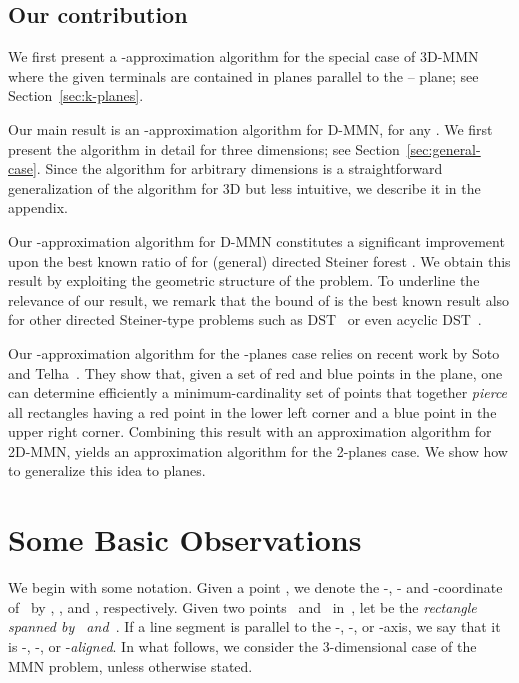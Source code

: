 \documentclass[11pt]{llncs}
\begin{document}
\subsection{Our contribution}  


We first present a -approximation algorithm for the special
case of 3D-MMN where the given terminals are contained in 
planes parallel to the -- plane; see Section~\ref{sec:k-planes}.

Our main result is an -approximation algorithm for
D-MMN, for any .  We first present the algorithm in detail
for three dimensions; see Section~\ref{sec:general-case}.  Since the
algorithm for arbitrary 
dimensions is a straightforward generalization of the algorithm for 3D
but less intuitive, we describe it in the appendix.

Our -approximation algorithm for D-MMN constitutes a
significant improvement 
upon the best known ratio of  for (general) directed
Steiner forest \cite{fkn-iaadsf-09}. We obtain this result by
exploiting the geometric structure of the problem.  To underline the
relevance of our result, we remark that the bound of  is the
best known result also for other directed Steiner-type problems such
as DST~\cite{cccdggl-aadsp-98} or even acyclic
DST~\cite{zelikovsky-adstapprox-97}. 

Our -approximation algorithm for the -planes case relies on
recent work by Soto and Telha~\cite{st-2dorg-11}.
They show that, given a set of red and blue points in the plane, one
can determine efficiently a minimum-cardinality set of points that
together \emph{pierce} all rectangles having a red point in the lower
left corner and a blue point in the upper right corner. Combining this
result with an approximation algorithm for 2D-MMN, 
yields an approximation algorithm for the 2-planes case.  We show how to
generalize this idea to  planes.

\section{Some Basic Observations}\label{sec:basic-observations}

We begin with some notation. Given a point , we
denote the -, - and -coordinate of~ by , , and
, respectively.  Given two points~ and~ in~, let
 be the \emph{rectangle spanned by~ and~}.
If a line segment is parallel to the -, -, or -axis, we say
that it is -, -, or -\emph{aligned}.
In what follows, we consider the
3-dimensional case of the MMN problem, unless otherwise stated.
\end{document}
